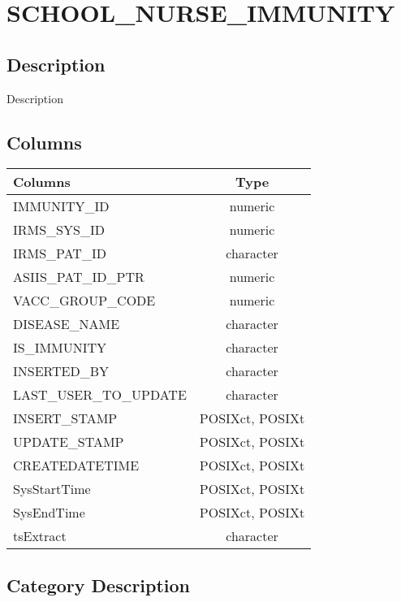 \documentclass[
  letterpaper,
  DIV=11,
  numbers=noendperiod]{scrreprt}
\begin{document}
\hypertarget{school_nurse_immunity}{%
\chapter*{SCHOOL\_NURSE\_IMMUNITY}\label{school_nurse_immunity}}

\hypertarget{description-36}{%
\section*{Description}\label{description-36}}

Description

\hypertarget{columns-36}{%
\section*{Columns}\label{columns-36}}

\begin{longtable}{lc}
\toprule
Columns & Type \\ 
\midrule
IMMUNITY\_ID & numeric \\ 
IRMS\_SYS\_ID & numeric \\ 
IRMS\_PAT\_ID & character \\ 
ASIIS\_PAT\_ID\_PTR & numeric \\ 
VACC\_GROUP\_CODE & numeric \\ 
DISEASE\_NAME & character \\ 
IS\_IMMUNITY & character \\ 
INSERTED\_BY & character \\ 
LAST\_USER\_TO\_UPDATE & character \\ 
INSERT\_STAMP & POSIXct, POSIXt \\ 
UPDATE\_STAMP & POSIXct, POSIXt \\ 
CREATEDATETIME & POSIXct, POSIXt \\ 
SysStartTime & POSIXct, POSIXt \\ 
SysEndTime & POSIXct, POSIXt \\ 
tsExtract & character \\ 
\bottomrule
\end{longtable}

\hypertarget{category-description-36}{%
\section*{Category Description}\label{category-description-36}}
\end{document}

